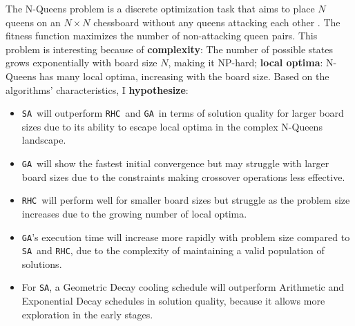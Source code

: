\documentclass[conference]{IEEEtran}
\newcommand{\sa}{\texttt{SA}}
\newcommand{\ga}{\texttt{GA}}
\newcommand{\rhc}{\texttt{RHC}}
\begin{document}
The N-Queens problem is a discrete optimization task that aims to place $N$ queens on an $N \times N$ chessboard without any queens attacking each other \cite{b1}. The fitness function maximizes the number of non-attacking queen pairs. This problem is interesting because of 
\textbf{complexity}: The number of possible states grows exponentially with board size $N$, making it NP-hard;
\textbf{local optima}: N-Queens has many local optima, increasing with the board size.
Based on the algorithms' characteristics, I \textbf{hypothesize}:
\begin{itemize}
    \item \sa\ will outperform \rhc\ and \ga\ in terms of solution quality for larger board sizes due to its ability to escape local optima in the complex N-Queens landscape.
    \item \ga\ will show the fastest initial convergence but may struggle with larger board sizes due to the constraints making crossover operations less effective.
    \item \rhc\ will perform well for smaller board sizes but struggle as the problem size increases due to the growing number of local optima.
    \item \ga's execution time will increase more rapidly with problem size compared to \sa\ and \rhc, due to the complexity of maintaining a valid population of solutions.
    \item For \sa, a Geometric Decay cooling schedule will outperform Arithmetic and Exponential Decay schedules in solution quality, because it allows more exploration in the early stages.
\end{itemize}
\end{document}
